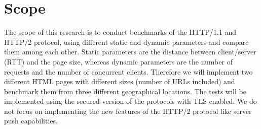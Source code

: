 \section{Scope}
\label{scope}
The scope of this research is to conduct benchmarks of the HTTP/1.1 and HTTP/2 protocol, using different static and dynamic parameters and compare them among each other. Static parameters are the distance between client/server (RTT) and the page size, whereas dynamic parameters are the number of requests and the number of concurrent clients. Therefore we will implement two different HTML pages with different sizes (number of URLs included) and benchmark them from three different geographical locations. The tests will be implemented using the secured version of the protocols with TLS enabled. We do not focus on implementing the new features of the HTTP/2 protocol like server push capabilities.  
